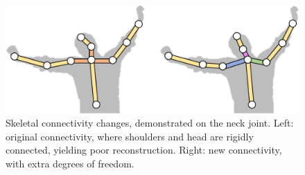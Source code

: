 \begin{figure}[tbh]
\centering
\includegraphics[width=\linewidth]{./images/Skeleton_Difference_Shoulders.pdf}
\setlength{\abovecaptionskip}{-5pt plus 3pt minus 2pt}
\setlength{\belowcaptionskip}{-3pt plus 3pt minus 2pt}
\caption{Skeletal connectivity changes, demonstrated on the neck joint. Left: original connectivity, where shoulders and head are rigidly connected, yielding poor reconstruction. Right: new connectivity, with extra degrees of freedom. }
\label{fig:skeletal_change}
\end{figure}